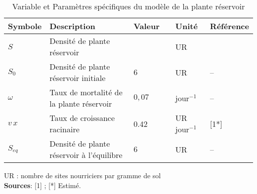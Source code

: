 \begin{table}[h]

  \caption{Variable et Paramètres spécifiques du modèle de la plante réservoir}
  \begin{tabular}{@{}l@{ }l@{ }l@{ }l@{ }l@{ }l@{}}
    \hline
    Symbole & Description                      & Valeur & & Unité & Référence \\
    \hline   
    $S$  & Densité de plante réservoir  &          & & UR   & \\
       \hline
    $S_0$  & Densité de plante réservoir initiale & $6$ &  & UR & -- \\
    $\omega$  & Taux de mortalité de la plante réservoir & $0,07$ &  & jour$^{-1}$  & -- \\
    $v\,x$  & Taux de croissance racinaire & 0.42 &  & UR jour$^{-1}$& [1*] \\
    $S_{eq}$  & Densité de plante réservoir à l'équilibre & $6$ &  & UR & -- \\
    \hline
  \end{tabular}
  \label{tab:planteReservoir}
  \par\medskip\footnotesize
  UR : nombre de sites nourriciers par gramme de sol \\
   \textbf{Sources}: [1] \citet{Leskovar1990}; [*] Estimé.
\end{table}

\thispagestyle{empty} 
